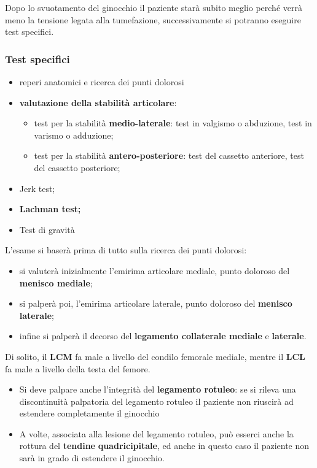 Dopo lo svuotamento del ginocchio il paziente starà subito meglio perché verrà meno la tensione legata alla tumefazione, successivamente si potranno eseguire test
specifici.

\subsubsection{Test specifici}

\begin{itemize}
\item
  reperi anatomici e ricerca dei punti dolorosi
\item
  \textbf{valutazione della stabilità articolare}:
\begin{itemize}
\item test per la stabilità \textbf{medio-laterale}: test in valgismo o abduzione, test in varismo o adduzione;
\item test per la stabilità \textbf{antero-posteriore}: test del cassetto anteriore, test del cassetto posteriore;
\end{itemize}
\item
  Jerk test;
\item
  \textbf{Lachman test;}
\item
  Test di gravità
\end{itemize}

L'esame si baserà prima di tutto sulla ricerca dei punti dolorosi:

\begin{itemize}
\item
  si valuterà inizialmente l'emirima articolare mediale, punto doloroso del \textbf{menisco mediale};
\item
  si palperà poi, l'emirima articolare laterale, punto doloroso del \textbf{menisco laterale};
\item
  infine si palperà il decorso del \textbf{legamento collaterale mediale} e \textbf{laterale}.
\end{itemize}

Di solito, il \textbf{LCM} fa male a livello del condilo femorale mediale, mentre il \textbf{LCL} fa male a livello della testa del femore.

\begin{itemize}
\item
  Si deve palpare anche l'integrità del \textbf{legamento rotuleo}: se si rileva una discontinuità palpatoria del legamento rotuleo il paziente non riuscirà ad estendere completamente il
ginocchio
\item
  A volte, associata alla lesione del legamento rotuleo, può esserci anche la rottura del \textbf{tendine} \textbf{quadricipitale}, ed anche in questo caso il paziente non sarà in grado di estendere il ginocchio.
\end{itemize}

